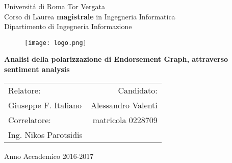 \thispagestyle{empty}
\vspace{-1.5cm} \bfseries{
\begin{center}
  \large
  Universit\'a di Roma Tor Vergata\\
  \normalsize
  Corso di Laurea \textbf{magistrale} in Ingegneria Informatica\\
  Dipartimento di Ingegneria Informazione\\
 
\vspace{0.5cm}
  \begin{figure}[htbp]
    \begin{center}
      \texttt{[image: logo.png]}
    \end{center}
  \end{figure}
  \vspace{0.5cm} \Large
 
  \textbf{Analisi della polarizzazione di Endorsement Graph, attraverso sentiment analysis}\\

  \vspace{.75cm} \large
\end{center}

\vspace{1.5cm} \large


\begin{tabularx}{\textwidth}{XR}
Relatore: & Candidato:\\
Giuseppe F. Italiano & Alessandro Valenti\\
Correlatore: & matricola 0228709\\
Ing. Nikos Parotsidis &\\
\end{tabularx}














\vspace{1.5cm}
\begin{center}



  Anno Accademico 2016-2017
\end{center} \clearpage
}
